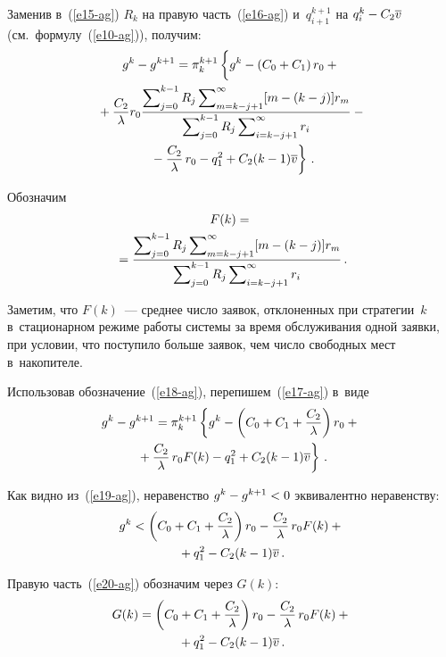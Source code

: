 \begin{multicols}{2}
  Заменив в~(\ref{e15-ag}) $R_k$ на правую часть~(\ref{e16-ag}) 
и~$q_{i+1}^{k+1}$ на $q_i^k\hm- C_2\overline{v}$ (см.\  
формулу~(\ref{e10-ag})), получим:
  \begin{multline}
  g^k-g^{k+1} =\pi_k^{k+1} \left\{
  \vphantom{\fr{C_1}{\lambda}}
   g^k -\left( C_0+C_1\right) r_0 +{}\right.\\
{}+\fr{C_2}{\lambda} r_0 \fr{\sum\nolimits_{j=0}^{k-1} R_j  
\sum\nolimits_{m=k-j+1}^\infty [m-(k-j)]r_m}{\sum\nolimits_{j=0}^{k-1} R_j 
\sum\nolimits_{i=k-j+1}^\infty r_i} - {}\\
\left.{}-\fr{C_2}{\lambda}\,r_0 -q_1^2 +C_2 (k-1) 
\overline{v}\right\}\,.
  \label{e17-ag}
  \end{multline} 
  
  Обозначим 
  \begin{multline}
  F(k) = {}\\
  {}=\displaystyle\frac{\displaystyle \sum\nolimits_{j=0}^{k-1} R_j  \sum\nolimits_{m=k-j+1}^\infty [m-
(k-j)]r_m\mathstrut}{\displaystyle \sum\nolimits_{j=0}^{k-1} R_j \sum\nolimits_{i=k-j+1}^\infty r_i\mathstrut}\,.
  \label{e18-ag}
  \end{multline}
  
  Заметим, что $F(k)$~--- среднее число заявок, отклоненных при 
стратегии~$k$ в~стационарном режиме работы системы за время обслуживания 
одной заявки, при условии, что поступило больше заявок, чем число свободных 
мест в~накопителе.
  
  Использовав обозначение~(\ref{e18-ag}), перепишем~(\ref{e17-ag}) в~виде
  \begin{multline}
  g^k-g^{k+1}=\pi_k^{k+1}\left\{ g^k -\left( C_0+C_1+\displaystyle\frac{\displaystyle C_2\mathstrut}{\displaystyle \lambda\mathstrut}\right) 
r_0 +{}\right.\\
  \left.{}+ \displaystyle\frac{\displaystyle C_2\mathstrut}{\displaystyle \lambda\mathstrut}\,r_0 F(k) -q_1^2 +C_2(k-1)\overline{v}\right\}\,.
  \label{e19-ag}
  \end{multline}
  
  Как видно из~(\ref{e19-ag}), неравенство $g^k\hm- g^{k+1} \hm<0$ 
эквивалентно неравенству: 
  \begin{multline}
  g^k < \left( C_0 +C_1 +\displaystyle\frac{\displaystyle C_2\mathstrut}{\displaystyle \lambda\mathstrut}\right) r_0 -\displaystyle\frac{\displaystyle C_2\mathstrut}{\displaystyle \lambda\mathstrut}\,r_0 
F(k) +{}\\
  {}+ q_1^2 -C_2(k-1)\overline{v}\,.
  \label{e20-ag}
  \end{multline}
  
  Правую часть~(\ref{e20-ag}) обозначим через $G(k)$:
  \begin{multline}
  G(k) = \left( C_0 +C_1 +\displaystyle\frac{\displaystyle C_2\mathstrut}{\displaystyle \lambda\mathstrut}\right) r_0 -\displaystyle\frac{\displaystyle C_2\mathstrut}{\displaystyle \lambda\mathstrut}\,r_0 
F(k) +{}\\
  {}+ q_1^2 -C_2(k-1)\overline{v}\,.
  \label{e21-ag}
  \end{multline}
  

\end{multicols}
